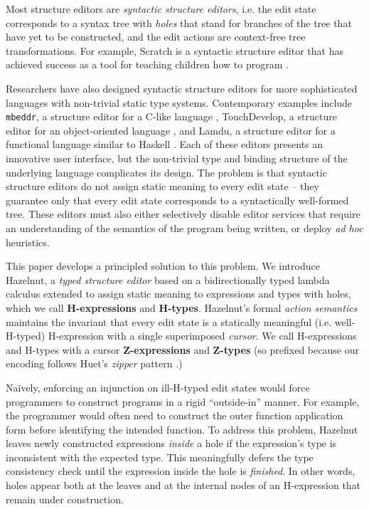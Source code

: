 Most structure editors are \emph{syntactic structure editors}, i.e. the
edit state corresponds to a syntax tree with \emph{holes} that stand for branches of
the tree that have yet to be constructed, and the edit actions are
context-free tree transformations. For example, Scratch is a syntactic
structure editor that has achieved success as a tool for teaching children
how to program \cite{Resnick:2009:SP:1592761.1592779}. %

Researchers have also 
 designed  syntactic structure editors for more sophisticated languages with non-trivial  
static type systems. Contemporary examples include \texttt{mbeddr}, a structure editor for a C-like
language \cite{voelter_mbeddr:_2012}, TouchDevelop, a structure editor for an
object-oriented language \cite{tillmann_touchdevelop:_2011}, and Lamdu, a structure 
editor for a functional language similar to Haskell \cite{lamdu}. Each of
these editors presents an innovative user interface, but the non-trivial
type and binding structure of the underlying language complicates its
design. The problem is that syntactic structure editors do not assign static meaning to every edit state -- they guarantee only that every edit state corresponds to  a 
syntactically well-formed tree. These editors must also either selectively disable editor services that require an understanding of the semantics of the program being written, or deploy \emph{ad hoc} heuristics.


This paper develops a principled solution to this problem. We introduce
Hazelnut, a \emph{typed structure editor} based on a bidirectionally typed
lambda calculus extended to assign static meaning to expressions and types
with {holes}, which we call \textbf{H-expressions}
and \textbf{H-types}. Hazelnut's formal \emph{action semantics} maintains
the invariant that every edit state is a statically meaningful
(i.e. well-H-typed) H-expression with a single superimposed \emph{cursor}. We
call H-expressions and H-types with a cursor \textbf{Z-expressions}
and \textbf{Z-types} (so prefixed because our encoding follows
Huet's \emph{zipper} pattern \cite{JFP::Huet1997}.)

Na\"ively, enforcing an injunction on ill-H-typed edit states would force
programmers to construct programs in a rigid ``outside-in'' manner. For
example, the programmer would often need to construct the outer function
application form before identifying the intended function. To address this
problem, Hazelnut leaves newly constructed expressions \emph{inside} a hole
if the expression's type is inconsistent with the expected type. This
meaningfully defers the type consistency check until the expression inside
the hole is \emph{finished}. In other words, holes appear both at the
leaves and at the internal nodes of an H-expression that remain under
construction.

